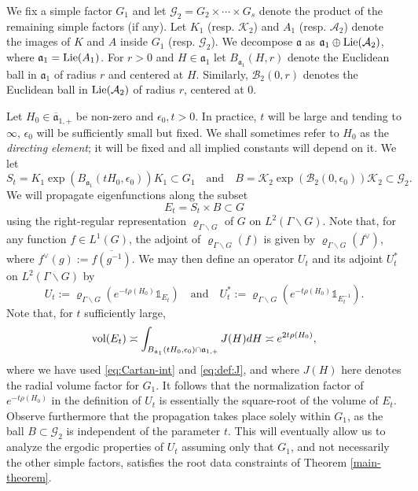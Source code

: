 \documentclass[12pt]{amsart}
\theoremstyle{remark}
\newcommand{\ga}{\mathfrak a}
\begin{document}
We fix a simple factor $G_1$ and let $\mathcal{G}_2=G_2\times\cdots \times G_s$ denote the product of the remaining simple factors (if any). Let $K_1$ (resp. $\mathcal{K}_2$) and $A_1$ (resp. $\mathcal{A}_2$) denote the images of $K$ and $A$ inside $G_1$ (resp. $\mathcal{G}_2$). We decompose $\ga$ as $\ga_1\oplus {\rm Lie}(\mathcal{A}_2)$, where $\ga_1={\rm Lie}(A_1)$. For $r>0$ and $H\in\ga_1$ let $B_{\ga_1}(H,r)$ denote the Euclidean ball in $\ga_1$ of radius $r$ and centered at $H$. Similarly, $\mathcal{B}_2(0,r)$ denotes the Euclidean ball in ${\rm Lie}(\mathcal{A}_2)$ of radius $r$, centered at $0$.

Let $H_0\in\overline{\ga}_{1,+}$ be non-zero and $\epsilon_0,t>0$. In practice, $t$ will be large and tending to $\infty$, $\epsilon_0$ will be sufficiently small but fixed. We shall sometimes refer to $H_0$ as the \textit{directing element}; it will be fixed and all implied constants will depend on it. We let
\begin{equation}\label{eq:def-St}
S_t= K_1\exp(B_{\ga_1}(tH_0,\epsilon_0))K_1\subset G_1 \quad\textrm{and}\quad B=\mathcal{K}_2 \exp( \mathcal{B}_2(0,\epsilon_0)) \mathcal{K}_2\subset \mathcal{G}_2.
\end{equation}
We will propagate eigenfunctions along the subset
\begin{equation}\label{eq:StimesB}
E_t = S_t\times B\subset G
\end{equation}
using the right-regular representation $\varrho_{\Gamma\backslash G}$ of $G$ on $L^2(\Gamma\backslash G)$. Note that, for any function $f\in L^1(G)$, the adjoint of $\varrho_{\Gamma\backslash G}(f)$ is given by $\varrho_{\Gamma\backslash G}(f^\vee)$, where $f^\vee(g) := \overline{f(g^{-1})}$. We may then define an operator $U_t$ and its adjoint $U_t^*$ on $L^2(\Gamma\backslash G)$ by
\[
U_t := \varrho_{\Gamma\backslash G}(e^{-t \rho(H_0)} \mathds{1}_{E_t}) \quad\textrm{and}\quad U_t^* := \varrho_{\Gamma\backslash G}(e^{-t \rho(H_0)}\mathds{1}_{E_t^{-1}}).
\]
Note that, for $t$ sufficiently large,
\[
\textnormal{vol}(E_t)\asymp \int_{B_{\ga_1}(tH_0,\epsilon_0)\cap \ga_{1,+}} J(H)dH\asymp e^{2t \rho(H_0)},
\]
where we have used \eqref{eq:Cartan-int} and \eqref{eq:def:J}, and where $J(H)$ here denotes the radial volume factor for $G_1$. It follows that the normalization factor of $e^{-t \rho(H_0)}$ in the definition of $U_t$ is essentially the square-root of the volume of $E_t$. Observe furthermore that the propagation takes place solely within $G_1$, as the ball $B\subset\mathcal{G}_2$ is independent of the parameter $t$. This will eventually allow us to analyze the ergodic properties of $U_t$ assuming only that $G_1$, and not necessarily the other simple factors, satisfies the root data constraints of Theorem \ref{main-theorem}.
\end{document}
